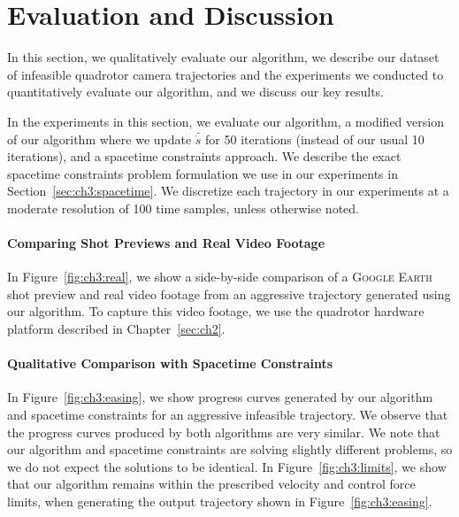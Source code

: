 \section{Evaluation and Discussion}
\label{sec:ch3:results}

In this section, we qualitatively evaluate our algorithm, we describe our dataset of infeasible quadrotor camera trajectories and the experiments we conducted to quantitatively evaluate our algorithm, and we discuss our key results.

In the experiments in this section, we evaluate our algorithm, a modified version of our algorithm where we update $\bar{\dot{s}}$ for 50 iterations (instead of our usual 10 iterations), and a spacetime constraints approach.
We describe the exact spacetime constraints problem formulation we use in our experiments in Section~\ref{sec:ch3:spacetime}.
We discretize each trajectory in our experiments at a moderate resolution of 100 time samples, unless otherwise noted.

\paragraph{Comparing Shot Previews and Real Video Footage}

In Figure~\ref{fig:ch3:real}, we show a side-by-side comparison of a \textsc{Google Earth} shot preview and real video footage from an aggressive trajectory generated using our algorithm.
To capture this video footage, we use the quadrotor hardware platform described in Chapter~\ref{sec:ch2}.

\paragraph{Qualitative Comparison with Spacetime Constraints}


In Figure~\ref{fig:ch3:easing}, we show progress curves generated by our algorithm and spacetime constraints for an aggressive infeasible trajectory.
We observe that the progress curves produced by both algorithms are very similar.
We note that our algorithm and spacetime constraints are solving slightly different problems, so we do not expect the solutions to be identical.
In Figure~\ref{fig:ch3:limits}, we show that our algorithm remains within the prescribed velocity and control force limits, when generating the output trajectory shown in Figure~\ref{fig:ch3:easing}.

